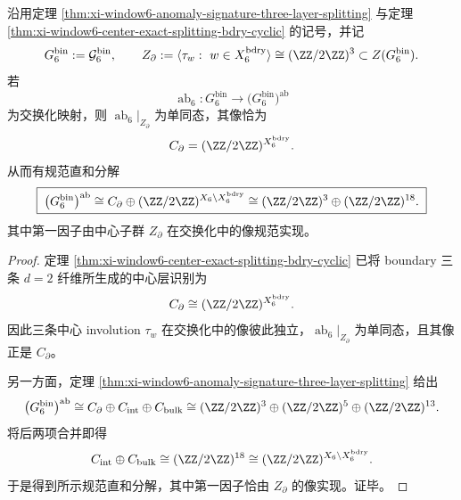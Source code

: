\begin{theorem}\label{thm:xi-window6-boundary-parity-canonical-direct-summand}
沿用定理 \ref{thm:xi-window6-anomaly-signature-three-layer-splitting} 与定理
\ref{thm:xi-window6-center-exact-splitting-bdry-cyclic} 的记号，并记
\[
G_6^{\mathrm{bin}}:=\mathcal G_6^{\mathrm{bin}},
\qquad
Z_{\partial}:=\langle \tau_w:\ w\in X_6^{\mathrm{bdry}}\rangle
\cong
(\ZZ/2\ZZ)^3
\subset Z(G_6^{\mathrm{bin}}).
\]
若
\[
\operatorname{ab}_6:G_6^{\mathrm{bin}}\longrightarrow \bigl(G_6^{\mathrm{bin}}\bigr)^{\mathrm{ab}}
\]
为交换化映射，则 \(\operatorname{ab}_6|_{Z_{\partial}}\) 为单同态，其像恰为
\[
C_{\partial}=(\ZZ/2\ZZ)^{X_6^{\mathrm{bdry}}}.
\]
从而有规范直和分解
\[
\boxed{\;
\bigl(G_6^{\mathrm{bin}}\bigr)^{\mathrm{ab}}
\cong
C_{\partial}\oplus (\ZZ/2\ZZ)^{X_6\setminus X_6^{\mathrm{bdry}}}
\cong
(\ZZ/2\ZZ)^3\oplus(\ZZ/2\ZZ)^{18}.\;}
\]
其中第一因子由中心子群 \(Z_{\partial}\) 在交换化中的像规范实现。
\end{theorem}
\begin{proof}
定理 \ref{thm:xi-window6-center-exact-splitting-bdry-cyclic} 已将 boundary 三条 \(d=2\) 纤维所生成的中心层识别为
\[
C_{\partial}\cong (\ZZ/2\ZZ)^{X_6^{\mathrm{bdry}}}.
\]
因此三条中心 involution \(\tau_w\) 在交换化中的像彼此独立，\(\operatorname{ab}_6|_{Z_{\partial}}\) 为单同态，且其像正是 \(C_{\partial}\)。

另一方面，定理 \ref{thm:xi-window6-anomaly-signature-three-layer-splitting} 给出
\[
\bigl(G_6^{\mathrm{bin}}\bigr)^{\mathrm{ab}}
\cong
C_{\partial}\oplus C_{\mathrm{int}}\oplus C_{\mathrm{bulk}}
\cong
(\ZZ/2\ZZ)^3\oplus(\ZZ/2\ZZ)^5\oplus(\ZZ/2\ZZ)^{13}.
\]
将后两项合并即得
\[
C_{\mathrm{int}}\oplus C_{\mathrm{bulk}}
\cong
(\ZZ/2\ZZ)^{18}
\cong
(\ZZ/2\ZZ)^{X_6\setminus X_6^{\mathrm{bdry}}}.
\]
于是得到所示规范直和分解，其中第一因子恰由 \(Z_{\partial}\) 的像实现。证毕。
\end{proof}

